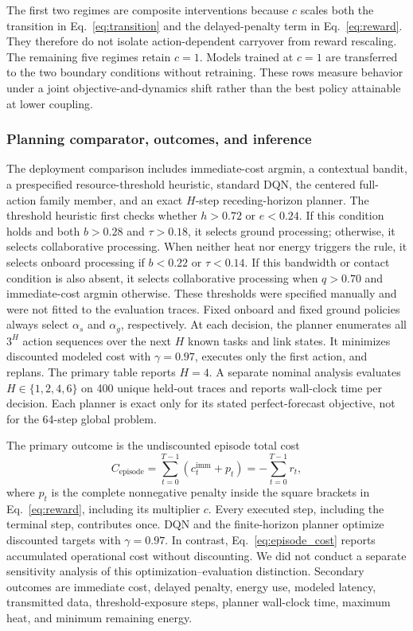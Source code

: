 \documentclass[remotesensing,article,submit,moreauthors]{Definitions/mdpi}
\begin{document}
The first two regimes are composite interventions because $c$ scales both the transition in Eq.~\eqref{eq:transition} and the delayed-penalty term in Eq.~\eqref{eq:reward}. They therefore do not isolate action-dependent carryover from reward rescaling. The remaining five regimes retain $c=1$. Models trained at $c=1$ are transferred to the two boundary conditions without retraining. These rows measure behavior under a joint objective-and-dynamics shift rather than the best policy attainable at lower coupling.

\subsubsection{Planning comparator, outcomes, and inference}

The deployment comparison includes immediate-cost argmin, a contextual bandit, a prespecified resource-threshold heuristic, standard DQN, the centered full-action family member, and an exact $H$-step receding-horizon planner. The threshold heuristic first checks whether $h>0.72$ or $e<0.24$. If this condition holds and both $b>0.28$ and $\tau>0.18$, it selects ground processing; otherwise, it selects collaborative processing. When neither heat nor energy triggers the rule, it selects onboard processing if $b<0.22$ or $\tau<0.14$. If this bandwidth or contact condition is also absent, it selects collaborative processing when $q>0.70$ and immediate-cost argmin otherwise. These thresholds were specified manually and were not fitted to the evaluation traces. Fixed onboard and fixed ground policies always select $\alpha_s$ and $\alpha_g$, respectively. At each decision, the planner enumerates all $3^H$ action sequences over the next $H$ known tasks and link states. It minimizes discounted modeled cost with $\gamma=0.97$, executes only the first action, and replans. The primary table reports $H=4$. A separate nominal analysis evaluates $H\in\{1,2,4,6\}$ on 400 unique held-out traces and reports wall-clock time per decision. Each planner is exact only for its stated perfect-forecast objective, not for the 64-step global problem.

The primary outcome is the undiscounted episode total cost
\begin{equation}
C_{\mathrm{episode}}=\sum_{t=0}^{T-1}\left(c^{\mathrm{imm}}_t+p_t\right)=-\sum_{t=0}^{T-1}r_t,
\label{eq:episode_cost}
\end{equation}
where $p_t$ is the complete nonnegative penalty inside the square brackets in Eq.~\eqref{eq:reward}, including its multiplier $c$. Every executed step, including the terminal step, contributes once. DQN and the finite-horizon planner optimize discounted targets with $\gamma=0.97$. In contrast, Eq.~\eqref{eq:episode_cost} reports accumulated operational cost without discounting. We did not conduct a separate sensitivity analysis of this optimization--evaluation distinction. Secondary outcomes are immediate cost, delayed penalty, energy use, modeled latency, transmitted data, threshold-exposure steps, planner wall-clock time, maximum heat, and minimum remaining energy.
\end{document}
